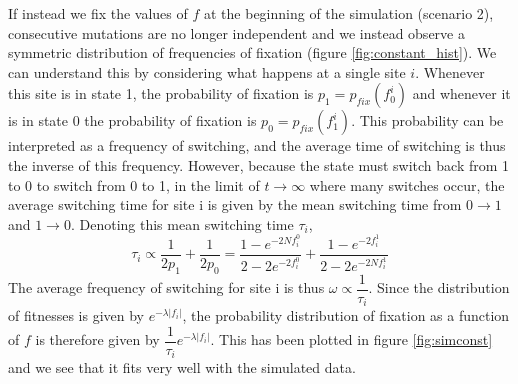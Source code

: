 \documentclass{article}
\begin{document}
If instead we fix the values of $f$ at the beginning of the simulation (scenario 2), consecutive mutations are no longer independent and we instead observe a symmetric distribution of frequencies of fixation (figure \ref{fig:constant_hist}). We can understand this by considering what happens at a single site $i$. Whenever this site is in state 1, the probability of fixation is $p_1 = p_{fix}(f_0^i)$ and whenever it is in state 0 the probability of fixation is $p_0 = p_{fix}(f_1^i)$. This probability can be interpreted as a frequency of switching, and the average time of switching is thus the inverse of this frequency. However, because the state must switch back from 1 to 0 to switch from 0 to 1, in the limit of $t \rightarrow \infty$ where many switches occur, the average switching time for site i is given by the mean switching time from $0 \rightarrow 1$ and $1 \rightarrow 0$. Denoting this mean switching time $\tau_i$,
\begin{equation}
\tau_i \propto \dfrac{1}{2p_1} + \dfrac{1}{2p_0} = \dfrac{1- e^{-2 N f_i^0}}{2- 2e^{-2 f_i^0}} + \dfrac{1- e^{-2 f_i^1}}{2- 2e^{-2 N f_i^1}}
\end{equation}
The average frequency of switching for site i is thus $\omega \propto \dfrac{1}{\tau_i}$.
Since the distribution of fitnesses is given by $e^{-\lambda |f_i|}$, the probability distribution of fixation as a function of $f$ is therefore given by $\dfrac{1}{\tau_i} e^{-\lambda |f_i|} $.
This has been plotted in figure \ref{fig:simconst} and we see that it fits very well with the simulated data.
\end{document}
